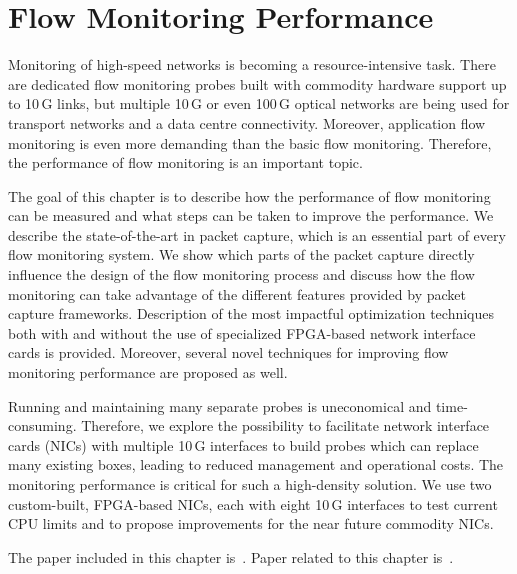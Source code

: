 \chapter{Flow Monitoring Performance}\label{chap:flow-monitoring-performance}

\begin{chapintro}

Monitoring of high-speed networks is becoming a resource-intensive task. There are dedicated flow monitoring probes built with commodity hardware support up to 10\,G links, but multiple 10\,G or even 100\,G optical networks are being used for transport networks and a data centre connectivity. Moreover, application flow monitoring is even more demanding than the basic flow monitoring. Therefore, the performance of flow monitoring is an important topic.

The goal of this chapter is to describe how the performance of flow monitoring can be measured and what steps can be taken to improve the performance. We describe the state-of-the-art in packet capture, which is an essential part of every flow monitoring system. We show which parts of the packet capture directly influence the design of the flow monitoring process and discuss how the flow monitoring can take advantage of the different features provided by packet capture frameworks. Description of the most impactful optimization techniques both with and without the use of specialized FPGA-based network interface cards is provided. Moreover, several novel techniques for improving flow monitoring performance are proposed as well.

Running and maintaining many separate probes is uneconomical and time-consuming. Therefore, we explore the possibility to facilitate network interface cards (NICs) with multiple 10\,G interfaces to build probes which can replace many existing boxes, leading to reduced management and operational costs. The monitoring performance is critical for such a high-density solution. We use two custom-built, FPGA-based NICs, each with eight 10\,G interfaces to test current CPU limits and to propose improvements for the near future commodity NICs.

The paper included in this chapter is~\cite{Velan-2015-High}. %
Paper related to this chapter is~\cite{Pus-2015-Hardware}.


\end{chapintro}
